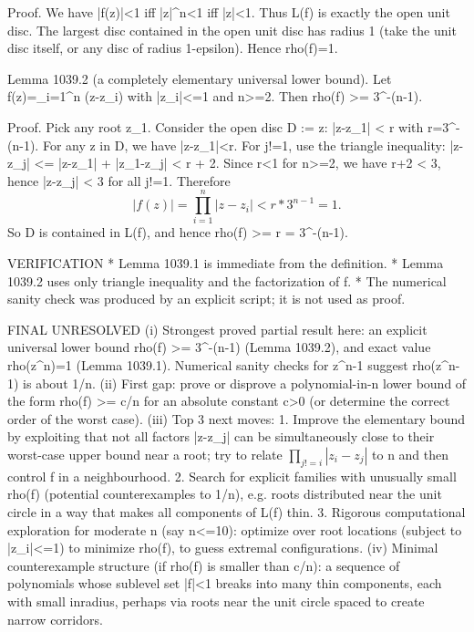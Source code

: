 Proof.
We have |f(z)|<1 iff |z|^n<1 iff |z|<1. Thus L(f) is exactly the open unit disc. The largest disc contained in the open unit disc has radius 1 (take the unit disc itself, or any disc of radius 1-epsilon). Hence rho(f)=1.

Lemma 1039.2 (a completely elementary universal lower bound).
Let f(z)=\prod_{i=1}^n (z-z_i) with |z_i|<=1 and n>=2. Then rho(f) >= 3^{-(n-1)}.

Proof.
Pick any root z_1. Consider the open disc D := {z: |z-z_1| < r} with r=3^{-(n-1)}.
For any z in D, we have |z-z_1|<r. For j!=1, use the triangle inequality:
  |z-z_j| <= |z-z_1| + |z_1-z_j| < r + 2.
Since r<1 for n>=2, we have r+2 < 3, hence |z-z_j| < 3 for all j!=1.
Therefore
\[
  |f(z)| = \prod_{i=1}^n |z-z_i| < r * 3^{n-1} = 1.
\]
So D is contained in L(f), and hence rho(f) >= r = 3^{-(n-1)}.

VERIFICATION
* Lemma 1039.1 is immediate from the definition.
* Lemma 1039.2 uses only triangle inequality and the factorization of f.
* The numerical sanity check was produced by an explicit script; it is not used as proof.

FINAL
UNRESOLVED
(i) Strongest proved partial result here: an explicit universal lower bound rho(f) >= 3^{-(n-1)} (Lemma 1039.2), and exact value rho(z^n)=1 (Lemma 1039.1). Numerical sanity checks for z^n-1 suggest rho(z^n-1) is about 1/n.
(ii) First gap: prove or disprove a polynomial-in-n lower bound of the form rho(f) >= c/n for an absolute constant c>0 (or determine the correct order of the worst case).
(iii) Top 3 next moves:
  1. Improve the elementary bound by exploiting that not all factors |z-z_j| can be simultaneously close to their worst-case upper bound near a root; try to relate \(\prod_{j!=i} |z_i-z_j|\) to n and then control f in a neighbourhood.
  2. Search for explicit families with unusually small rho(f) (potential counterexamples to 1/n), e.g. roots distributed near the unit circle in a way that makes all components of L(f) thin.
  3. Rigorous computational exploration for moderate n (say n<=10): optimize over root locations (subject to |z_i|<=1) to minimize rho(f), to guess extremal configurations.
(iv) Minimal counterexample structure (if rho(f) is smaller than c/n): a sequence of polynomials whose sublevel set |f|<1 breaks into many thin components, each with small inradius, perhaps via roots near the unit circle spaced to create narrow corridors.

